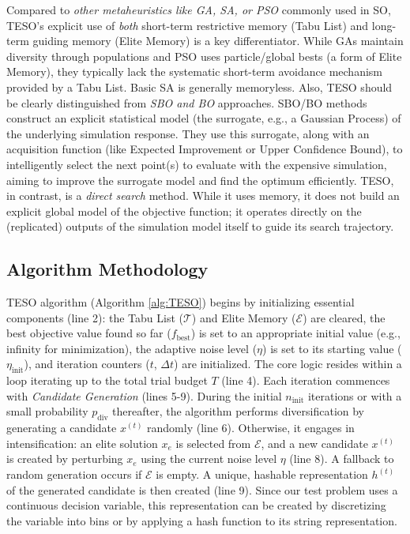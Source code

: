 \documentclass{article}
\begin{document}
Compared to \textit{other metaheuristics like GA, SA, or PSO} commonly used in SO, TESO's explicit use of \textit{both} short-term restrictive memory (Tabu List) and long-term guiding memory (Elite Memory) is a key differentiator. While GAs maintain diversity through populations and PSO uses particle/global bests (a form of Elite Memory), they typically lack the systematic short-term avoidance mechanism provided by a Tabu List. Basic SA is generally memoryless.  Also, TESO should be clearly distinguished from \textit{SBO and BO} approaches. SBO/BO methods construct an explicit statistical model (the surrogate, e.g., a Gaussian Process) of the underlying simulation response. They use this surrogate, along with an acquisition function (like Expected Improvement or Upper Confidence Bound), to intelligently select the next point(s) to evaluate with the expensive simulation, aiming to improve the surrogate model and find the optimum efficiently. TESO, in contrast, is a \textit{direct search} method. While it uses memory, it does not build an explicit global model of the objective function; it operates directly on the (replicated) outputs of the simulation model itself to guide its search trajectory. 


\subsection{Algorithm Methodology}
\label{subsec:teso_methodology}  

TESO algorithm (Algorithm \ref{alg:TESO}) begins by initializing essential components (line 2): the Tabu List ($\mathcal{T}$) and Elite Memory ($\mathcal{E}$) are cleared, the best objective value found so far ($f_{\text{best}}$) is set to an appropriate initial value (e.g., infinity for minimization), the adaptive noise level ($\eta$) is set to its starting value ($\eta_{\text{init}}$), and iteration counters ($t$, $\Delta t$) are initialized. The core logic resides within a loop iterating up to the total trial budget $T$ (line 4). Each iteration commences with \textit{Candidate Generation} (lines 5-9). During the initial $n_{\text{init}}$ iterations or with a small probability $p_{\text{div}}$ thereafter, the algorithm performs diversification by generating a candidate $x^{(t)}$ randomly (line 6). Otherwise, it engages in intensification: an elite solution $x_e$ is selected from $\mathcal{E}$, and a new candidate $x^{(t)}$ is created by perturbing $x_e$ using the current noise level $\eta$ (line 8). A fallback to random generation occurs if $\mathcal{E}$ is empty. A unique, hashable representation $h^{(t)}$ of the generated candidate is then created (line 9). Since our test problem uses a continuous decision variable, this representation can be created by discretizing the variable into bins or by applying a hash function to its string representation. 
\end{document}
